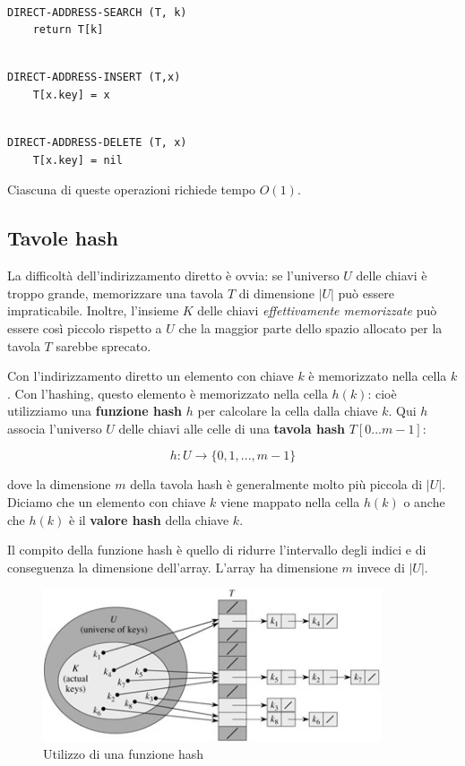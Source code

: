 \begin{lstlisting}

DIRECT-ADDRESS-SEARCH (T, k)
	return T[k]

\end{lstlisting}

\begin{lstlisting}

DIRECT-ADDRESS-INSERT (T,x)
	T[x.key] = x

\end{lstlisting}

\begin{lstlisting}

DIRECT-ADDRESS-DELETE (T, x)
	T[x.key] = nil

\end{lstlisting}

Ciascuna di queste operazioni richiede tempo $O(1)$.

\subsection{Tavole hash}

La difficoltà dell'indirizzamento diretto è ovvia: se l'universo $U$ delle chiavi è troppo grande, memorizzare una tavola $T$ di dimensione $|U|$ può essere impraticabile. Inoltre, l'insieme $K$ delle chiavi \textit{effettivamente memorizzate} può essere così piccolo rispetto a $U$ che la maggior parte dello spazio allocato per la tavola $T$ sarebbe sprecato.

Con l'indirizzamento diretto un elemento con chiave $k$ è memorizzato nella cella $k$. Con l'hashing, questo elemento è memorizzato nella cella $h(k)$: cioè utilizziamo una \textbf{funzione hash} $h$ per calcolare la cella dalla chiave $k$. Qui $h$ associa l'universo $U$ delle chiavi alle celle di una \textbf{tavola hash} $T[0...m-1]$:

$$h:U\to \{0,1,...,m-1\}$$

dove la dimensione $m$ della tavola hash è generalmente molto più piccola di $|U|$. Diciamo che un elemento con chiave $k$ viene mappato nella cella $h(k)$ o anche che $h(k)$ è il \textbf{valore hash} della chiave $k$.

Il compito della funzione hash è quello di ridurre l'intervallo degli indici e di conseguenza la dimensione dell'array. L'array ha dimensione $m$ invece di $|U|$.

\begin{figure}[htpd]
\centering
\includegraphics[width=100mm]{images/hashing.jpg}
\caption{Utilizzo di una funzione hash}
\end{figure}

